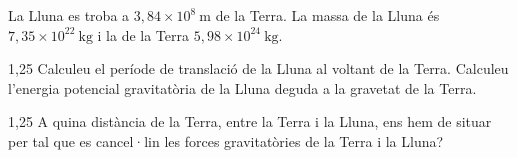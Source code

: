 La Lluna es troba a $3,84\times 10^{8}\ \mathrm{m}$ de la Terra. La massa de la Lluna és $7,35\times 10^{22}\ \mathrm{kg}$ i la de la Terra $5,98\times 10^{24}\ \mathrm{kg}$.

\begin{apartat}{1,25}
Calculeu el període de translació de la Lluna al voltant de la Terra. Calculeu l'energia potencial gravitatòria de la Lluna deguda a la gravetat de la Terra.
\end{apartat}

\begin{apartat}{1,25}
A quina distància de la Terra, entre la Terra i la Lluna, ens hem de situar per tal que es cancel·lin les forces gravitatòries de la Terra i la Lluna?
\end{apartat}

